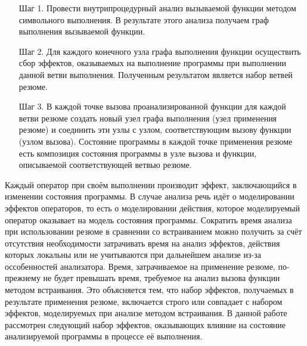 \begin{enumerate}
 \item[Шаг 1.] Провести внутрипроцедурный анализ вызываемой функции методом символьного выполнения. В результате этого анализа получаем граф выполнения вызываемой функции.
 \item[Шаг 2.] Для каждого конечного узла графа выполнения функции осуществить сбор эффектов, оказываемых на выполнение программы при выполнении данной ветви выполнения. Полученным результатом является набор ветвей резюме.
 \item[Шаг 3.] В каждой точке вызова проанализированной функции для каждой ветви резюме создать новый узел графа выполнения (узел применения резюме) и соединить эти узлы с узлом, соответствующим вызову функции (узлом вызова). Состояние программы в каждой точке применения резюме есть композиция состояния программы в узле вызова и функции, описываемой соответствующей ветвью резюме.
\end{enumerate}

Каждый оператор при своём выполнении производит эффект, заключающийся в изменении состояния программы. В случае анализа речь идёт о моделировании эффектов операторов, то есть о моделировании действия, которое моделируемый оператор оказывает на модель состояния программы. Сократить время анализа при использовании резюме в сравнении со встраиванием можно получить за счёт отсутствия необходимости затрачивать время на анализ эффектов, действия которых локальны или не учитываются при дальнейшем анализе из-за оссобенностей анализатора. Время, затрачиваемое на применение резюме, по-прежнему не будет превышать время, требуемое на анализ вызова функции методом встраивания. Это объясняется тем, что набор эффектов, получаемых в результате применения резюме, включается строго или совпадает с набором эффектов, моделируемых при анализе методом встраивания. В данной работе рассмотрен следующий набор эффектов, оказывающих влияние на состояние анализируемой программы в процессе её выполнения.

